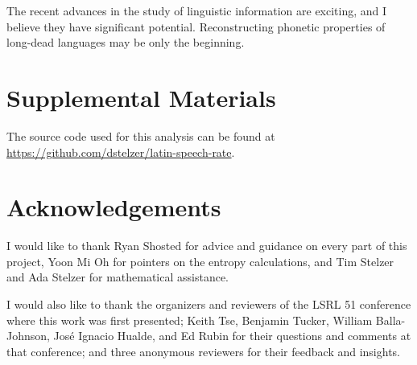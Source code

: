 \documentclass[12pt,twoside]{article}
\begin{document}
The recent advances in the study of linguistic information are exciting, and I believe they have significant potential. Reconstructing phonetic properties of long-dead languages may be only the beginning.

\section*{Supplemental Materials}

The source code used for this analysis can be found at \url{https://github.com/dstelzer/latin-speech-rate}.

\section*{Acknowledgements}

I would like to thank Ryan Shosted for advice and guidance on every part of this project, Yoon Mi Oh for pointers on the entropy calculations, and Tim Stelzer and Ada Stelzer for mathematical assistance.

I would also like to thank the organizers and reviewers of the LSRL 51 conference where this work was first presented; Keith Tse, Benjamin Tucker, William Balla-Johnson, José Ignacio Hualde, and Ed Rubin for their questions and comments at that conference; and three anonymous reviewers for their feedback and insights.

\label{sec:refs}
\setlength{}
\printbibliography
\end{document}
